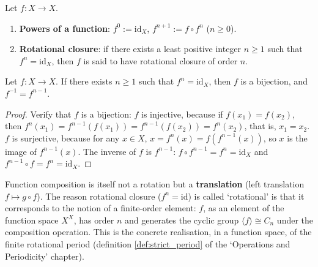\begin{definition}\label{def:rotation_composition}
Let $f: X \to X$.
\begin{enumerate}[label=(\roman*)]
    \item \textbf{Powers of a function}: $f^0 := \text{id}_X$, $f^{n+1} := f \circ f^n$ ($n \ge 0$).
    \item \textbf{Rotational closure}: if there exists a least positive integer $n \ge 1$ such that $f^n = \text{id}_X$, then $f$ is said to have rotational closure of order $n$.
\end{enumerate}
\end{definition}

\begin{proposition}\label{prop:rotation_closure_bijective}
Let $f: X \to X$. If there exists $n \ge 1$ such that $f^n = \text{id}_X$, then $f$ is a bijection, and $f^{-1} = f^{n-1}$.
\end{proposition}

\begin{proof}
Verify that $f$ is a bijection: $f$ is injective, because if $f(x_1) = f(x_2)$, then $f^n(x_1) = f^{n-1}(f(x_1)) = f^{n-1}(f(x_2)) = f^n(x_2)$, that is, $x_1 = x_2$. $f$ is surjective, because for any $x \in X$, $x = f^n(x) = f(f^{n-1}(x))$, so $x$ is the image of $f^{n-1}(x)$. The inverse of $f$ is $f^{n-1}$: $f \circ f^{n-1} = f^n = \text{id}_X$ and $f^{n-1} \circ f = f^n = \text{id}_X$.
\end{proof}

\begin{remark}\label{rem:composition_rotation}
Function composition is itself not a rotation but a \textbf{translation} (left translation $f \mapsto g \circ f$). The reason rotational closure ($f^n = \text{id}$) is called `rotational' is that it corresponds to the notion of a finite-order element: $f$, as an element of the function space $X^X$, has order $n$ and generates the cyclic group $\langle f \rangle \cong C_n$ under the composition operation. This is the concrete realisation, in a function space, of the finite rotational period (definition \ref{def:strict_period} of the `Operations and Periodicity' chapter).
\end{remark}

